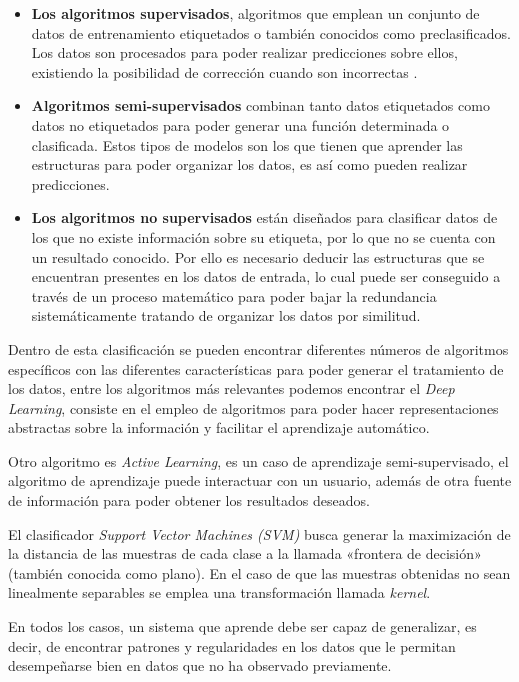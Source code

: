 \begin{itemize}
\item \textbf{Los algoritmos supervisados}, algoritmos que emplean un conjunto de datos de entrenamiento etiquetados o también conocidos como preclasificados. Los datos son procesados para poder realizar predicciones sobre ellos, existiendo la posibilidad de corrección cuando son incorrectas \cite{RussoC2016}. 

\item \textbf{Algoritmos semi-supervisados} combinan tanto datos etiquetados como datos no etiquetados para poder generar una función determinada o clasificada. Estos tipos de modelos son los que tienen que aprender las estructuras para poder organizar los datos, es así como pueden realizar predicciones.

\item \textbf{Los algoritmos no supervisados} están diseñados para clasificar datos de los que no existe información sobre su etiqueta, por lo que no se cuenta con un resultado conocido. Por ello es necesario deducir las estructuras que se encuentran presentes en los datos de entrada, lo cual puede ser conseguido a través de un proceso matemático para poder bajar la redundancia sistemáticamente tratando de organizar los datos por similitud.
\end{itemize}

Dentro de esta clasificación se pueden encontrar diferentes números de algoritmos específicos con las diferentes características para poder generar el tratamiento de los datos, entre los algoritmos más relevantes podemos encontrar el \textit{Deep Learning}, consiste en el empleo de algoritmos para poder hacer representaciones abstractas sobre la información y facilitar el aprendizaje automático. 

Otro algoritmo es \textit{Active Learning}, es un caso de aprendizaje semi-supervisado, el algoritmo de aprendizaje puede interactuar con un usuario, además de otra fuente de información para poder obtener los resultados deseados.

El clasificador \textit{Support Vector Machines (SVM)} busca generar la maximización de la distancia de las muestras de cada clase a la llamada «frontera de decisión» (también conocida como plano). En el caso de que las muestras obtenidas no sean linealmente separables se emplea una transformación llamada \textit{kernel}.

En todos los casos, un sistema que aprende debe ser capaz de generalizar, es decir, de encontrar patrones y regularidades en los datos que le permitan desempeñarse bien en datos que no ha observado previamente.


